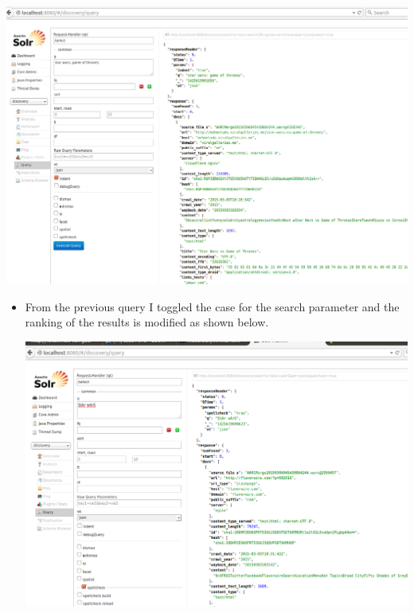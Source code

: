 \begin{minipage}{\linewidth}
	\includegraphics[scale=0.55]{figures/query/query_star_wars_game_of_thrones.PNG}
	\label{query_star_wars_game_of_thrones}
\end{minipage}
\begin{itemize}
\item From the previous query I toggled the case for the search parameter and the ranking of the results is modified as shown below.
\newpage
\begin{minipage}{\linewidth}
	\includegraphics[scale=0.55]{figures/query/query_star_wars.PNG}
	\label{query_chess}
\end{minipage}
\end{itemize}